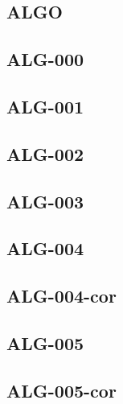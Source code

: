 \begin{multicols}{2}
\section*{ALGO}

\newcommand{\xxexo}{ALG-000}
\subsection*{\xxexo}
\graphicspath{{../../exos/algo/\xxexo/}}


\renewcommand{\xxexo}{ALG-001}
\subsection*{\xxexo}
\graphicspath{{../../exos/algo/\xxexo/}}


\renewcommand{\xxexo}{ALG-002}
\subsection*{\xxexo}
\graphicspath{{../../exos/algo/\xxexo/}}


\renewcommand{\xxexo}{ALG-003}
\subsection*{\xxexo}
\graphicspath{{../../exos/algo/\xxexo/}}


\renewcommand{\xxexo}{ALG-004}
\subsection*{\xxexo}
\graphicspath{{../../exos/algo/\xxexo/}}



\renewcommand{\xxexo}{ALG-004-cor}
\subsection*{\xxexo}


\renewcommand{\xxexo}{ALG-005}
\subsection*{\xxexo}
\graphicspath{{../../exos/algo/\xxexo/}}


\renewcommand{\xxexo}{ALG-005-cor}
\subsection*{\xxexo}
\graphicspath{{../../exos/algo/\xxexo/}}
\begin{corrige}

\end{corrige}


\end{multicols}
